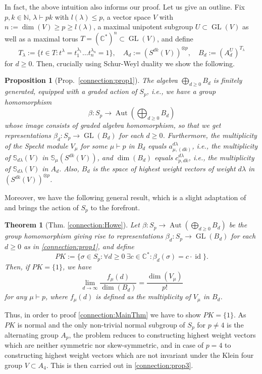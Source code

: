 \documentclass[a4paper]{amsart}
\newtheorem*{theorem*}{Theorem}
\newtheorem*{proposition*}{Proposition}
\def\N{{\mathbb{N}}}
\def\C{{\mathbb{C}}}
\DeclareMathOperator{\GL}{\mathrm{GL}}
\DeclareMathOperator{\Aut}{\mathrm{Aut}}
\DeclareMathOperator{\id}{\mathrm{id}}
\begin{document}
In fact, the above intuition also informs our proof.
Let us give an outline.
Fix $p,k\in\N$, $\lambda\vdash pk$ with $l(\lambda)\leq p$, a vector space $V$ with $n:=\dim(V)\geq p\geq l(\lambda)$, a maximal unipotent subgroup $U\subset\GL(V)$ as well as a maximal torus $T=(\C^*)^n\subset\GL(V)$, and define
\begin{displaymath}
	T_\lambda:=\{t\in T:t^\lambda=t_1^{\lambda_1}\ldots t_n^{\lambda_n}=1\},\quad
	A_d:=(S^{dk}(V))^{\otimes p},\quad
	B_d:=(A_d^U)^{T_\lambda}
\end{displaymath}
for $d\geq0$.
Then, crucially using Schur-Weyl duality we show the following.
\begin{proposition*}[Prop.\ \ref{connection:prop1}]
	The algebra $\bigoplus_{d\geq0}B_d$
	is finitely generated,
	equipped with a graded action of $S_p$, i.e., we have a group homomorphism
	\begin{displaymath}
		\beta:S_p\to\Aut(\bigoplus_{d\geq 0}B_d)
	\end{displaymath}
	whose image consists of graded algebra homomorphism,
	so that we get representations $\beta_d:S_p\to\GL(B_d)$ for each $d\geq 0$.
	Furthermore,
	the multiplicity of the Specht module $V_\mu$ for some $\mu\vdash p$ in $B_d$ equals $a_{\mu,(dk)}^{d\lambda}$,
	i.e., the multiplicity of $\mathbb{S}_{d\lambda}(V)$ in $\mathbb{S}_\mu(S^{dk}(V))$, and $\dim(B_d)$ equals $c_{p,dk}^{d\lambda}$, i.e., the multiplicity of $\mathbb{S}_{d\lambda}(V)$ in $A_d$.
	Also, $B_d$ is the space of highest weight vectors of weight $d\lambda$ in $(S^{dk}(V))^{\otimes p}$.
\end{proposition*}
Moreover, we have the following general result, which is a slight adaptation of \cite{How89} and brings the action of $S_p$ to the forefront.
\begin{theorem*}[Thm. \ref{connection:Howe}]
	Let $\beta:S_p\to\Aut(\bigoplus_{d\geq0}B_d)$ be the group homomorphism giving rise to representations $\beta_d:S_p\to\GL(B_d)$ for each $d\geq 0$ as in \cref{connection:prop1}, and define
	\begin{displaymath}
		PK:=\{\sigma\in S_p:\forall d\geq0\ \exists c\in\C^*:\beta_d(\sigma)=c\cdot \id\}.
	\end{displaymath}
	Then, if $PK=\{1\}$, we have
	\begin{displaymath}
		\lim\limits_{d\to\infty}\frac{f_\mu(d)}{\dim(B_d)}=\frac{\dim(V_\mu)}{p!}
	\end{displaymath}
	 for any $\mu\vdash p$, where $f_\mu(d)$ is defined as the multiplicity of $V_\mu$ in $B_d$.
\end{theorem*}
Thus, in order to proof \cref{connection:MainThm} we have to show $PK=\{1\}$.
As $PK$ is normal and the only non-trivial normal subgroup of $S_p$ for $p\neq 4$ is the alternating group $A_p$, the problem reduces to constructing highest weight vectors which are neither symmetric nor skew-symmetric, and in case of $p=4$ to constructing highest weight vectors which are not invariant under the Klein four group $V\subset A_4
$.
This is then carried out in \cref{connection:prop3}.
\end{document}
